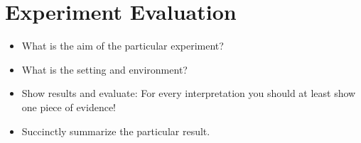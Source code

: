 \chapter{Experiment Evaluation}\label{cha:exp}

\begin{itemize}
  \item What is the aim of the particular experiment?
  \item What is the setting and environment?
  \item Show results and evaluate: For every interpretation you should at least show one piece of evidence!
  \item Succinctly summarize the particular result.
\end{itemize}
